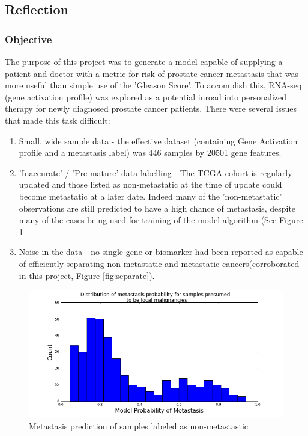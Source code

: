 \documentclass[final]{article}
\begin{document}
\subsection{Reflection}

\subsubsection{Objective}

The purpose of this project was to generate a model capable of supplying a
patient and doctor with a metric for risk of prostate cancer metastasis that was
more useful than simple use of the 'Gleason Score'.  To accomplish this, RNA-seq
(gene activation profile) was explored as a potential inroad into personalized
therapy for newly diagnosed prostate cancer patients.  There were several issues
that made this task difficult:

\begin{enumerate} \item Small, wide sample data - the effective dataset
(containing Gene Activation profile and a metastasis label) was 446 samples by
20501 gene features.
\item 'Inaccurate' / 'Pre-mature' data labelling - The TCGA
cohort is regularly updated and those listed as non-metastatic at the time of
update could become metastatic at a later date.  Indeed many of the
'non-metastatic' observations are still predicted to have a high chance of
metastasis, despite many of the cases being used for training of the model
algorithm (See Figure \ref{fig:n0}
\item Noise in the data - no single gene or
biomarker had been reported as capable of efficiently separating non-metastatic
and metastatic cancers(corroborated in this project, Figure \ref{fig:separate}).
\end{enumerate}

\begin{figure}
  \centering
  \includegraphics[scale=0.5]{N0Analysis}
  \caption{\label{fig:n0} Metastasis prediction of samples labeled as non-metastastic}
\end{figure}
\end{document}
